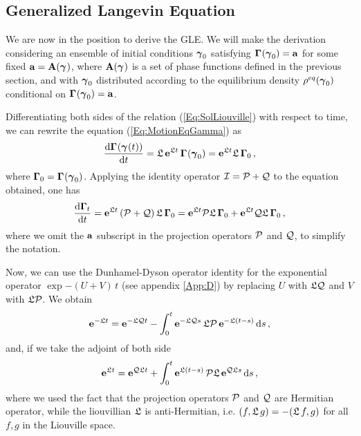 \documentclass[10pt,a4paper]{book}
\theoremstyle{definition}
\begin{document}
\subsection{Generalized Langevin Equation}
\label{Sec:GLE}
We are now in the position to derive the GLE. We will make the derivation considering an ensemble of initial conditions $\boldsymbol\gamma_{0}$ satisfying $\boldsymbol\Gamma_{}(\boldsymbol\gamma_{0})=\mathbf{a}$ for some fixed $\mathbf{a}=\mathbf{A}(\boldsymbol\gamma_{})$, where $\mathbf{A}(\boldsymbol\gamma_{})$ is a set of phase functions defined in the previous section, and with $\boldsymbol\gamma_{0}$ distributed according to the equilibrium density $\rho^{eq}(\boldsymbol\gamma_{0})$ conditional on $\boldsymbol\Gamma_{}(\boldsymbol\gamma_{0})=\mathbf{a}$.  

Differentiating both sides of the relation (\ref{Eq:SolLiouville}) with respect to time, we can rewrite the equation (\ref{Eq:MotionEqGamma}) as
\begin{equation}
 \frac{\mbox{d}\boldsymbol\Gamma_{}(\boldsymbol\gamma_{}(t))}{\mbox{d}t} = \mathfrak{L}\,\mathbf{e}^{\mathfrak{L} t}\,\boldsymbol\Gamma_{}(\boldsymbol\gamma_{0}) = \mathbf{e}^{\mathfrak{L} t}\mathfrak{L}\,\boldsymbol\Gamma_{0}\,, 
\end{equation}
where $\boldsymbol\Gamma_{0}=\boldsymbol\Gamma_{}(\boldsymbol\gamma_{0})$. Applying the identity operator $\mathcal{I}=\mathcal{P}+\mathcal{Q}$ to the equation obtained, one has
\begin{equation}\label{Eq:MoIdProj}
 \frac{\mbox{d}\boldsymbol\Gamma_{t}}{\mbox{d}t} = \mathbf{e}^{\mathfrak{L} t}\left(\mathcal{P}+\mathcal{Q}\right)\mathfrak{L}\,\boldsymbol\Gamma_{0}=
 \mathbf{e}^{\mathfrak{L} t}\mathcal{P}\mathfrak{L}\,\boldsymbol\Gamma_{0} + \mathbf{e}^{\mathfrak{L} t}\mathcal{Q}\mathfrak{L}\,\boldsymbol\Gamma_{0}\,, 
\end{equation}
where we omit the $\mathbf{a}$ subscript in the projection operators $\mathcal{P}$ and $\mathcal{Q}$, to simplify the notation.

Now, we can use the  Dunhamel-Dyson operator identity for the exponential operator $\exp{-(U+V)\,t}$ (see appendix \ref{App:D}) by replacing $U$ with $\mathfrak{L}\mathcal{Q}$ and $V$ with $\mathfrak{L}\mathcal{P}$. We obtain
$$
\mathbf{e}^{-\mathfrak{L} t} = \mathbf{e}^{-\mathfrak{L}\mathcal{Q} t}-\int_0^{t}\mathbf{e}^{-\mathfrak{L}\mathcal{Q} s}\,\mathfrak{L}\mathcal{P} \,\mathbf{e}^{-\mathfrak{L}(t-s)}\,\mbox{d} s\,,
$$
and, if we take the adjoint of both side
\begin{equation}
 \mathbf{e}^{\mathfrak{L} t} = \mathbf{e}^{\mathcal{Q}\mathfrak{L} t} + \int_0^t \mathbf{e}^{\mathfrak{L} (t-s)}\,\mathcal{P}\mathfrak{L}\,\mathbf{e}^{\mathcal{Q}\mathfrak{L} s}\,\mbox{d} s\,,
\end{equation}
where we used the fact that the projection operators $\mathcal{P}$ and $\mathcal{Q}$ are Hermitian operator, while the liouvillian $\mathfrak{L}$ is anti-Hermitian, i.e. $(f,\mathfrak{L}\, g)=-(\mathfrak{L}\, f,g)$ for all $f,g$ in the Liouville space.
\end{document}
